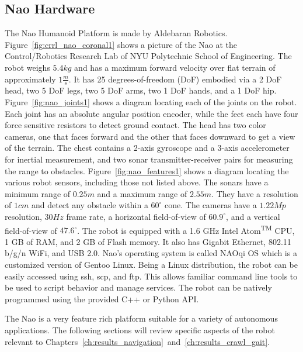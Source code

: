 \subsection{Nao Hardware}
The Nao Humanoid Platform is made by Aldebaran Robotics. 
Figure~\ref{fig:crrl_nao_coronal1} shows a picture of the Nao at the
Control/Robotics Research Lab of NYU Polytechnic School of Engineering.
The robot weighs $5.4 kg$ and has a maximum forward velocity over flat
terrain of approximately $1 \frac{m}{s}$.
It has 25 degrees-of-freedom (DoF) embodied via a 2 DoF head, two 5 DoF legs,
two 5 DoF arms, two 1 DoF hands, and a 1 DoF hip.
Figure~\ref{fig:nao_joints1} shows a diagram locating each of the joints on
the robot.
Each joint has an absolute angular position encoder, while the feet each have
four force sensitive resistors to detect ground contact.
The head has two color cameras, one that faces forward and the other that faces
downward to get a view of the terrain. The chest contains a 2-axis gyroscope and
a 3-axis accelerometer for inertial measurement, and two sonar transmitter-receiver
pairs for measuring the range to obstacles.
Figure~\ref{fig:nao_features1} shows a diagram locating the various robot sensors,
including those not listed above.
The sonars have a minimum range of $0.25 m$ and a maximum range of $2.55 m$.
They have a resolution of $1 cm$ and detect any obstacle within a $60^\circ$
cone. The cameras have a $1.22 Mp$ resolution, $30 Hz$ frame rate,
a horizontal field-of-view of $60.9^\circ$, and a vertical field-of-view of
$47.6^\circ$.
The robot is equipped with a 1.6 GHz Intel\textsuperscript{\textregistered}
Atom\textsuperscript{TM} CPU, 1 GB of RAM, and 2 GB of Flash memory.
It also has Gigabit Ethernet, 802.11 b/g/n WiFi, and USB 2.0. 
Nao's operating system is called NAOqi OS which is a customized version of
Gentoo Linux. Being a Linux distribution, the robot can be easily accessed
using ssh, scp, and ftp. This allows familiar command line tools to be used
to script behavior and manage services.
The robot can be natively programmed using the provided C++ or Python API.

The Nao is a very feature rich platform suitable for a variety of autonomous
applications. The following sections will review specific aspects of the robot
relevant to Chapters~\ref{ch:results_navigation}~and~\ref{ch:results_crawl_gait}.


